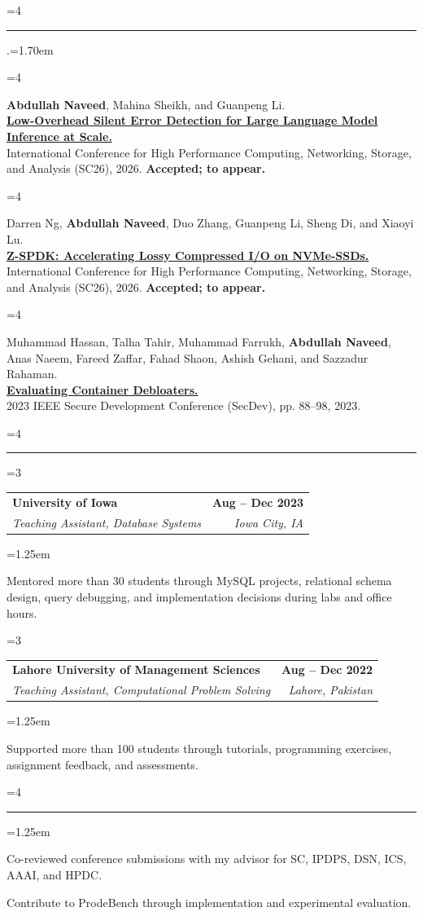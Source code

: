 \documentclass[10pt,letterpaper]{article}
\makeatletter
\newcommand{\needspace}[1]{\par\begingroup\dimen0=#1\relax\ifdim\dimexpr\pagegoal-\pagetotal\relax<\dimen0\vfil\break\fi\endgroup}
\renewcommand{\section}[1]{\needspace{4\baselineskip}\vspace{.82em}{\normalsize\bfseries #1\par}\vspace{.16em}\hrule\vspace{.38em}}
\newenvironment{cvitems}{\begin{list}{\textbullet}{\leftmargin=1.25em\itemsep=1.5pt\topsep=1pt\parsep=0pt\partopsep=0pt}}{\end{list}\vspace{.18em}}
\newenvironment{publications}{\begin{list}{\arabic{enumi}.}{\usecounter{enumi}\leftmargin=1.70em\itemsep=6pt\topsep=2pt\parsep=0pt\partopsep=0pt}}{\end{list}}
\newcommand{\cventry}[4]{\needspace{3\baselineskip}\begin{tabularx}{\textwidth}{@{}Xr@{}}\textbf{#1}&\textbf{#2}\\\textit{#3}&\textit{#4}\end{tabularx}\vspace{-.20em}}
\newcommand{\publication}[3]{\needspace{4\baselineskip}\item #1\\[-.08em]\textbf{#2}\\[-.08em]#3}
\makeatother
\begin{document}
\section{Publications}
\begin{publications}
  \publication{\textbf{Abdullah Naveed}, Mahina Sheikh, and Guanpeng Li.}
    {\href{https://sc26.conference-program.com/presentation/?id=pap435\&sess=sess228}{Low-Overhead Silent Error Detection for Large Language Model Inference at Scale.}}
    {International Conference for High Performance Computing, Networking, Storage, and Analysis (SC26), 2026. \textbf{Accepted; to appear.}}
  \publication{Darren Ng, \textbf{Abdullah Naveed}, Duo Zhang, Guanpeng Li, Sheng Di, and Xiaoyi Lu.}
    {\href{https://sc26.conference-program.com/presentation/?id=pap1023\&sess=sess202}{Z-SPDK: Accelerating Lossy Compressed I/O on NVMe-SSDs.}}
    {International Conference for High Performance Computing, Networking, Storage, and Analysis (SC26), 2026. \textbf{Accepted; to appear.}}
  \publication{Muhammad Hassan, Talha Tahir, Muhammad Farrukh, \textbf{Abdullah Naveed}, Anas Naeem, Fareed Zaffar, Fahad Shaon, Ashish Gehani, and Sazzadur Rahaman.}
    {\href{https://doi.org/10.1109/SecDev56634.2023.00023}{Evaluating Container Debloaters.}}
    {2023 IEEE Secure Development Conference (SecDev), pp. 88--98, 2023.}
\end{publications}

\section{Teaching Experience}
\cventry{University of Iowa}{Aug -- Dec 2023}{Teaching Assistant, Database Systems}{Iowa City, IA}
\begin{cvitems}
  \item Mentored more than 30 students through MySQL projects, relational schema design, query debugging, and implementation decisions during labs and office hours.
\end{cvitems}
\cventry{Lahore University of Management Sciences}{Aug -- Dec 2022}{Teaching Assistant, Computational Problem Solving}{Lahore, Pakistan}
\begin{cvitems}
  \item Supported more than 100 students through tutorials, programming exercises, assignment feedback, and assessments.
\end{cvitems}

\section{Professional Service}
\begin{cvitems}
  \item Co-reviewed conference submissions with my advisor for SC, IPDPS, DSN, ICS, AAAI, and HPDC.
  \item Contribute to ProdeBench through implementation and experimental evaluation.
\end{cvitems}
\end{document}

